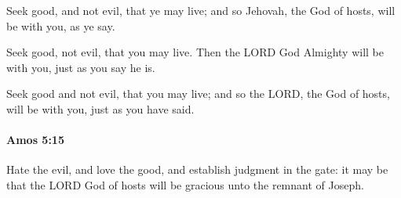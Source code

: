 			\begin{versebox}
					\item[BHS] 
					\item[LXX] 
					\item[ASV] Seek good, and not evil, that ye may live; and so Jehovah, the God of hosts, will be with you, as ye say.
					\item[NIV] Seek good, not evil, that you may live. Then the LORD God Almighty will be with you, just as you say he is.
					\item[NRSV] Seek good and not evil, that you may live; and so the LORD, the God of hosts, will be with you, just as you have said.
			\end{versebox}

		\paragraph{Amos 5:15} %
			\label{AMOS-5-15}

			Hate the evil, and love the good, and establish judgment in the gate: it may be that the LORD God of hosts will be gracious unto the remnant of Joseph.

